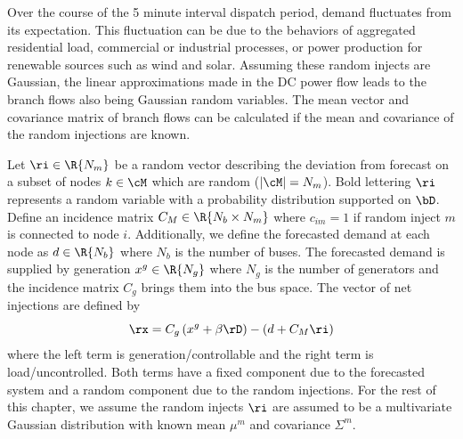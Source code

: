 Over the course of the 5 minute interval dispatch period, demand  fluctuates from its expectation.  This  fluctuation can be due to the behaviors of aggregated residential load, commercial or industrial processes, or power production for renewable sources such as wind and solar.  Assuming these random injects are Gaussian, the linear approximations made in the DC power flow leads to the branch flows also being Gaussian random variables.  The mean vector and covariance matrix of branch flows can be calculated if the mean and covariance of the random injections are known.

Let $\ri \in \R{N_m}$ be a random vector describing the deviation from forecast on a subset of nodes $k \in \cM$ which are random ($| \cM | = N_m$).  Bold lettering $\ri$ represents a random variable with a probability distribution supported on $\bD$.  Define an incidence matrix $C_M \in \R{N_b \times N_m}$ where $c_{im}=1$ if random inject $m$ is connected to node $i$.  Additionally, we define the forecasted demand at each node as $d \in \R{N_b}$ where $N_b$ is the number of buses.  The forecasted demand is supplied by generation $x^g \in \R{N_g}$ where $N_g$ is the number of generators and the incidence matrix $C_g$ brings them into the bus space.    The vector of net injections are defined by 
\begin{equation}\label{rand_inj}
 \rx = C_g\left(x^g+\beta \rD\right) - (d + C_M \ri) 
\end{equation}
 where the left term is generation/controllable and the right term is load/uncontrolled.  Both terms have a fixed component due to the forecasted system and a random component due to the random injections.  For the rest of this chapter, we assume the random injects $\ri$ are assumed to be a multivariate Gaussian distribution with known mean $\mu^m$ and covariance $\Sigma^m$.  

